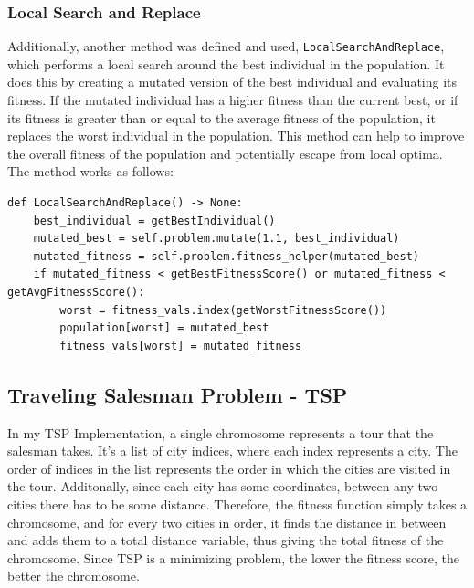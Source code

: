 \documentclass{article}
\theoremstyle{mytheoremstyle}
\theoremstyle{mytheoremstyle}
\theoremstyle{myproblemstyle}
\begin{document}
\subsubsection{Local Search and Replace}
Additionally, another method was defined and used, \texttt{LocalSearchAndReplace}, which performs a local search around the best individual in the population. It does this by creating a mutated version of the best individual and evaluating its fitness. If the mutated individual has a higher fitness than the current best, or if its fitness is greater than or equal to the average fitness of the population, it replaces the worst individual in the population. This method can help to improve the overall fitness of the population and potentially escape from local optima. The method works as follows:
\begin{lstlisting}[label=searchandreplace, caption={Local Search and Replace Implementation}]
def LocalSearchAndReplace() -> None:
    best_individual = getBestIndividual()
    mutated_best = self.problem.mutate(1.1, best_individual)
    mutated_fitness = self.problem.fitness_helper(mutated_best)
    if mutated_fitness < getBestFitnessScore() or mutated_fitness < getAvgFitnessScore():
        worst = fitness_vals.index(getWorstFitnessScore())
        population[worst] = mutated_best
        fitness_vals[worst] = mutated_fitness
\end{lstlisting}

\subsection{Traveling Salesman Problem - TSP}
In my TSP Implementation, a single chromosome represents a tour that the salesman takes. It's a list of city indices, where each index represents a city. The order of indices in the list represents the order in which the cities are visited in the tour. Additonally, since each city has some coordinates, between any two cities there has to be some distance. Therefore, the fitness function simply takes a chromosome, and for every two cities in order, it finds the distance in between and adds them to a total distance variable, thus giving the total fitness of the chromosome. Since TSP is a minimizing problem, the lower the fitness score, the better the chromosome.
\end{document}
